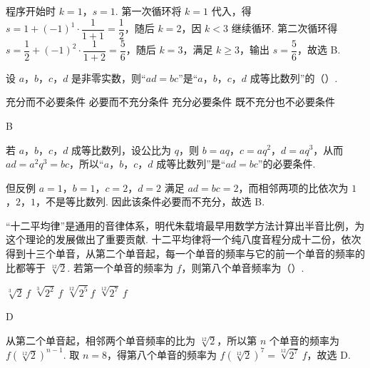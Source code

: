 \begin{solution}
程序开始时 \(k=1\)，\(s=1\). 第一次循环将 \(k=1\) 代入，得 \(s=1+(-1)^1\cdot\dfrac1{1+1}=\dfrac12\)，随后 \(k=2\)，因 \(k<3\) 继续循环. 第二次循环得 \(s=\dfrac12+(-1)^2\cdot\dfrac1{1+2}=\dfrac56\)，随后 \(k=3\)，满足 \(k\geq3\)，输出 \(s=\dfrac56\)，故选 B.
\end{solution}


\begin{problem}
设 \(a\)，\(b\)，\(c\)，\(d\) 是非零实数，则“\(ad=bc\)”是“\(a\)，\(b\)，\(c\)，\(d\) 成等比数列”的（\quad）.

\choices
    {充分而不必要条件}
    {必要而不充分条件}
    {充分必要条件}
    {既不充分也不必要条件}
\end{problem}

\begin{answer}
B
\end{answer}

\begin{solution}
若 \(a\)，\(b\)，\(c\)，\(d\) 成等比数列，设公比为 \(q\)，则 \(b=aq\)，\(c=aq^2\)，\(d=aq^3\)，从而 \(ad=a^2q^3=bc\)，所以“\(a\)，\(b\)，\(c\)，\(d\) 成等比数列”是“\(ad=bc\)”的必要条件.

但反例 \(a=1\)，\(b=1\)，\(c=2\)，\(d=2\) 满足 \(ad=bc=2\)，而相邻两项的比依次为 \(1\)，\(2\)，\(1\)，不是等比数列. 因此该条件必要而不充分，故选 B.
\end{solution}


\begin{problem}
“十二平均律”是通用的音律体系，明代朱载堉最早用数学方法计算出半音比例，为这个理论的发展做出了重要贡献. 十二平均律将一个纯八度音程分成十二份，依次得到十三个单音，从第二个单音起，每一个单音的频率与它的前一个单音的频率的比都等于 \(\sqrt[12]{2}\). 若第一个单音的频率为 \(f\)，则第八个单音频率为（\quad）.

\choices
    {\(\sqrt[3]{2}\,f\)}
    {\(\sqrt[3]{2^2}\,f\)}
    {\(\sqrt[12]{2^5}\,f\)}
    {\(\sqrt[12]{2^7}\,f\)}
\end{problem}

\begin{answer}
D
\end{answer}

\begin{solution}
从第二个单音起，相邻两个单音频率的比为 \(\sqrt[12]{2}\)，所以第 \(n\) 个单音的频率为 \(f\left(\sqrt[12]{2}\right)^{n-1}\). 取 \(n=8\)，得第八个单音的频率为 \(f\left(\sqrt[12]{2}\right)^7=\sqrt[12]{2^7}\,f\)，故选 D.
\end{solution}


